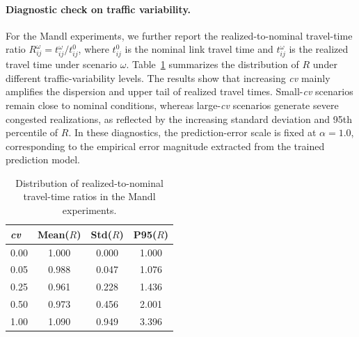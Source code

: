 
\paragraph{Diagnostic check on traffic variability.}
For the Mandl experiments, we further report the realized-to-nominal travel-time ratio
$R_{ij}^{\omega}=t_{ij}^{\omega}/t_{ij}^{0}$, where $t_{ij}^{0}$ is the nominal link travel time and $t_{ij}^{\omega}$ is the realized travel time under scenario $\omega$. Table~\ref{tab:travel_time_ratio} summarizes the distribution of $R$ under different traffic-variability levels. The results show that increasing \textit{cv} mainly amplifies the dispersion and upper tail of realized travel times. Small-\textit{cv} scenarios remain close to nominal conditions, whereas large-\textit{cv} scenarios generate severe congested realizations, as reflected by the increasing standard deviation and 95th percentile of $R$. In these diagnostics, the prediction-error scale is fixed at $\alpha=1.0$, corresponding to the empirical error magnitude extracted from the trained prediction model.

\begin{table}[htbp!]
\centering
\caption{Distribution of realized-to-nominal travel-time ratios in the Mandl experiments.}
\label{tab:travel_time_ratio}
\begin{tabular}{lccc}
\hline
\textit{cv} & Mean($R$) & Std($R$) & P95($R$) \\
\hline
0.00 & 1.000 & 0.000 & 1.000 \\
0.05 & 0.988 & 0.047 & 1.076 \\
0.25 & 0.961 & 0.228 & 1.436 \\
0.50 & 0.973 & 0.456 & 2.001 \\
1.00 & 1.090 & 0.949 & 3.396 \\
\hline
\end{tabular}
\end{table}



